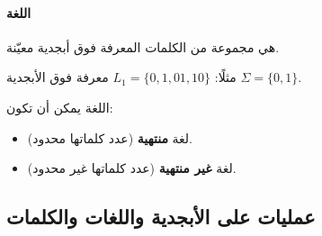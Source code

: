 \documentclass[12pt]{article}
\begin{document}
\paragraph{اللغة} هي مجموعة من الكلمات المعرفة فوق أبجدية معيّنة.

مثلًا:
$L_1 = \{0, 1, 01, 10\}$ معرفة فوق الأبجدية $\Sigma = \{0, 1\}$.

اللغة يمكن أن تكون:
\begin{itemize}
    \item لغة \textbf{منتهية} (عدد كلماتها محدود).
    \item لغة \textbf{غير منتهية} (عدد كلماتها غير محدود).
\end{itemize}

\subsection{عمليات على الأبجدية واللغات والكلمات}
\end{document}
